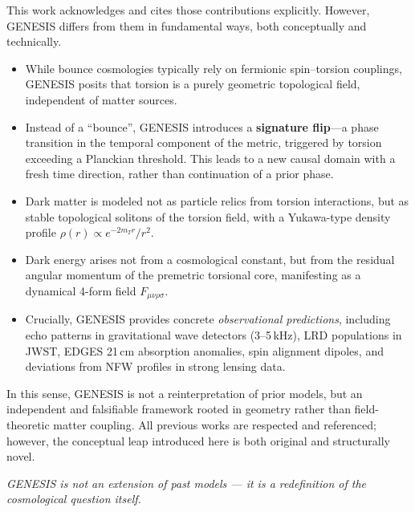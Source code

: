 \documentclass{article}
\begin{document}
This work acknowledges and cites those contributions explicitly. However, GENESIS differs from them in fundamental ways, both conceptually and technically.

\begin{itemize}
  \item While bounce cosmologies typically rely on fermionic spin–torsion couplings, GENESIS posits that torsion is a purely geometric topological field, independent of matter sources.
  \item Instead of a ``bounce'', GENESIS introduces a \textbf{signature flip}---a phase transition in the temporal component of the metric, triggered by torsion exceeding a Planckian threshold. This leads to a new causal domain with a fresh time direction, rather than continuation of a prior phase.
  \item Dark matter is modeled not as particle relics from torsion interactions, but as stable topological solitons of the torsion field, with a Yukawa-type density profile $\rho(r) \propto e^{-2m_T r}/r^2$.
  \item Dark energy arises not from a cosmological constant, but from the residual angular momentum of the premetric torsional core, manifesting as a dynamical 4-form field $F_{\mu\nu\rho\sigma}$.
  \item Crucially, GENESIS provides concrete \emph{observational predictions}, including echo patterns in gravitational wave detectors (3–5 kHz), LRD populations in JWST, EDGES 21 cm absorption anomalies, spin alignment dipoles, and deviations from NFW profiles in strong lensing data.
\end{itemize}

In this sense, GENESIS is not a reinterpretation of prior models, but an independent and falsifiable framework rooted in geometry rather than field-theoretic matter coupling. All previous works are respected and referenced; however, the conceptual leap introduced here is both original and structurally novel.

\textit{GENESIS is not an extension of past models — it is a redefinition of the cosmological question itself.}
\end{document}
